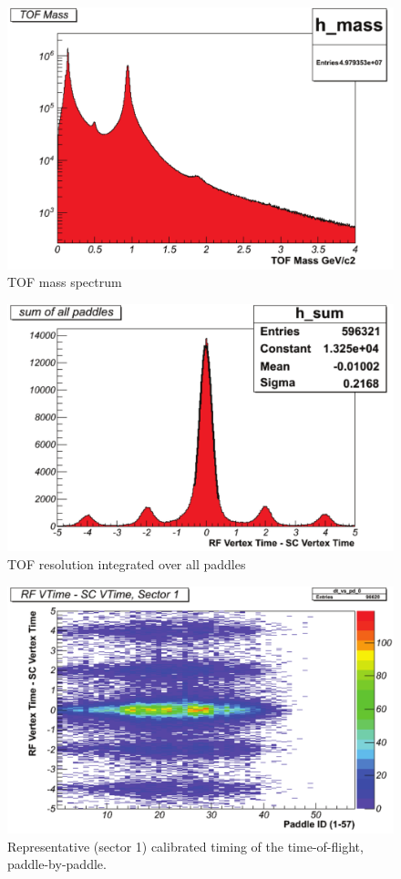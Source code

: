 \begin{figure}\begin{center}
    \includegraphics[width=.40\linewidth]{figures/calib/tof/Tof_56855_final_mass.pdf}
    \caption{TOF mass spectrum}
    \label{plt:tofmass}
\end{center}\end{figure}

\begin{figure}\begin{center}
    \includegraphics[width=.40\linewidth]{figures/calib/tof/Tof_56855_final_resolution.pdf}
    \caption{TOF resolution integrated over all paddles}
    \label{plt:tofres}
\end{center}\end{figure}

\begin{figure}\begin{center}
    \includegraphics[width=.40\linewidth]{figures/calib/tof/Tof_56855_final_s1p2p.pdf}
    \caption{Representative (sector 1) calibrated timing of the time-of-flight, paddle-by-paddle.}
    \label{plt:tofsec1}
\end{center}\end{figure}

